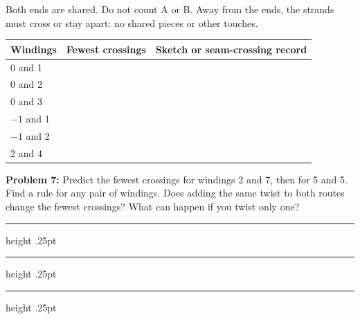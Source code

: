 \documentclass[11pt,letterpaper]{article}
\newcommand{\problem}[2]{\textbf{Problem #1:} #2\par}
\newcommand{\answerline}{\par\vspace{.32in}\hrule height .25pt}
\begin{document}
Both ends are shared. Do not count A or B. Away from the ends, the strands must cross or stay apart: no shared pieces or other touches.
\vspace{.12in}
\par\begin{tabular}{@{}p{.24\linewidth}p{.22\linewidth}p{.44\linewidth}@{}}
Windings & Fewest crossings & Sketch or seam-crossing record\\\hline
0 and 1 & & \\[.33in]\hline
0 and 2 & & \\[.33in]\hline
0 and 3 & & \\[.33in]\hline
$-1$ and 1 & & \\[.33in]\hline
$-1$ and 2 & & \\[.33in]\hline
2 and 4 & & \\[.33in]\hline
\end{tabular}\par
\vspace{.17in}
\problem{7}{Predict the fewest crossings for windings 2 and 7, then for 5 and 5. Find a rule for any pair of windings. Does adding the same twist to both routes change the fewest crossings? What can happen if you twist only one?}
\answerline\answerline\answerline
\end{document}
